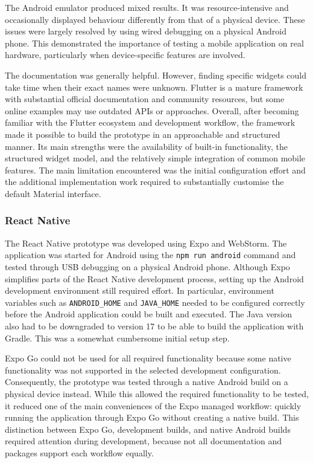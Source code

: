 The Android emulator produced mixed results.
It was resource-intensive and occasionally displayed behaviour differently from that of a physical device.
These issues were largely resolved by using wired debugging on a physical Android phone.
This demonstrated the importance of testing a mobile application on real hardware, particularly when device-specific features are involved.

The documentation was generally helpful.
However, finding specific widgets could take time when their exact names were unknown.
Flutter is a mature framework with substantial official documentation and community resources, but some online examples may use outdated APIs or approaches.
Overall, after becoming familiar with the Flutter ecosystem and development workflow, the framework made it possible to build the prototype in an approachable and structured manner.
Its main strengths were the availability of built-in functionality, the structured widget model, and the relatively simple integration of common mobile features.
The main limitation encountered was the initial configuration effort and the additional implementation work required to substantially customise the default Material interface.


\subsubsection{React Native}
The React Native prototype was developed using Expo and WebStorm.
The application was started for Android using the \texttt{npm run android} command and tested through USB debugging on a physical Android phone.
Although Expo simplifies parts of the React Native development process, setting up the Android development environment still required effort.
In particular, environment variables such as \texttt{ANDROID\_HOME} and \texttt{JAVA\_HOME} needed to be configured correctly before the Android application could be built and executed.
The Java version also had to be downgraded to version 17 to be able to build the application with Gradle.
This was a somewhat cumbersome initial setup step.

Expo Go could not be used for all required functionality because some native functionality was not supported in the selected development configuration.
Consequently, the prototype was tested through a native Android build on a physical device instead.
While this allowed the required functionality to be tested, it reduced one of the main conveniences of the Expo managed workflow: quickly running the application through Expo Go without creating a native build.
This distinction between Expo Go, development builds, and native Android builds required attention during development, because not all documentation and packages support each workflow equally.

